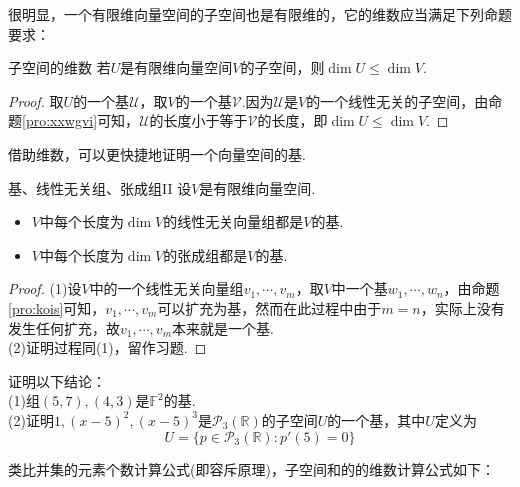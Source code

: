 \documentclass[lang=cn, zihao=5]{elegantbook}
\newcommand{\R}{\mathbb{R}}
\newcommand{\F}{\mathbb{F}}
\begin{document}
很明显，一个有限维向量空间的子空间也是有限维的，它的维数应当满足下列命题要求：

\begin{proposition}{子空间的维数}
	若$U$是有限维向量空间$V$的子空间，则$\dim U \leq \dim V$.
\end{proposition}
\begin{proof}
	取$U$的一个基$\mathcal{U}$，取$V$的一个基$\mathcal{V}$.因为$\mathcal{U}$是$V$的一个线性无关的子空间，由命题\ref{pro:xxwgvi}可知，$\mathcal{U}$的长度小于等于$\mathcal{V}$的长度，即$\dim U \leq \dim V$.
\end{proof}

借助维数，可以更快捷地证明一个向量空间的基.

\begin{proposition}{基、线性无关组、张成组II}
	设$V$是有限维向量空间.
	\begin{itemize}
		\item $V$中每个长度为$\dim V$的线性无关向量组都是$V$的基.
		\item $V$中每个长度为$\dim V$的张成组都是$V$的基.
	\end{itemize}
\end{proposition}
\begin{proof}
	(1)设$V$中的一个线性无关向量组$v_1, \cdots ,v_m$，取$V$中一个基$w_1 , \cdots , w_n$，由命题\ref{pro:kois}可知，$v_1, \cdots ,v_m$可以扩充为基，然而在此过程中由于$m=n$，实际上没有发生任何扩充，故$v_1, \cdots ,v_m$本来就是一个基. \\
	(2)证明过程同(1)，留作习题.
\end{proof}

\begin{example}
	证明以下结论： \\
	(1)组$(5,7),(4,3)$是$\F ^{2}$的基. \\
	(2)证明$1,(x-5)^2,(x-5)^3$是$\mathcal{P}_{3} (\R)$的子空间$U$的一个基，其中$U$定义为$$U = \{ p \in \mathcal{P}_{3} (\R) : p'(5)=0 \}$$
\end{example}

类比并集的元素个数计算公式(即容斥原理)，子空间和的的维数计算公式如下：
\end{document}
